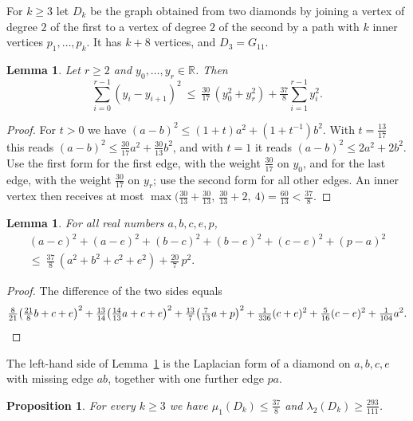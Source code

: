 \documentclass[11pt]{amsart}
\newtheorem{proposition}[theorem]{Proposition}
\newtheorem{lemma}[theorem]{Lemma}
\theoremstyle{definition}
\theoremstyle{remark}
\newcommand{\R}{\mathbb{R}}
\begin{document}
For $k\ge3$ let $D_k$ be the graph obtained from two diamonds by joining a vertex of degree $2$
of the first to a vertex of degree $2$ of the second by a path with $k$ inner vertices
$p_1,\dots,p_k$. It has $k+8$ vertices, and $D_3=G_{11}$.

\begin{lemma}\label{lem:path}
Let $r\ge2$ and $y_0,\dots,y_r\in\R$. Then
\[
\sum_{i=0}^{r-1}(y_i-y_{i+1})^2\ \le\ \tfrac{30}{17}\,(y_0^2+y_r^2)+\tfrac{37}{8}\sum_{i=1}^{r-1}y_i^2 .
\]
\end{lemma}

\begin{proof}
For $t>0$ we have $(a-b)^2\le(1+t)a^2+(1+t^{-1})b^2$. With $t=\frac{13}{17}$ this reads
$(a-b)^2\le\frac{30}{17}a^2+\frac{30}{13}b^2$, and with $t=1$ it reads $(a-b)^2\le2a^2+2b^2$. Use
the first form for the first edge, with the weight $\frac{30}{17}$ on $y_0$, and for the last
edge, with the weight $\frac{30}{17}$ on $y_r$; use the second form for all other edges. An
inner vertex then receives at most
$\max\bigl(\frac{30}{13}+\frac{30}{13},\ \frac{30}{13}+2,\ 4\bigr)=\frac{60}{13}<\frac{37}{8}$.
\end{proof}

\begin{lemma}\label{lem:diamond}
For all real numbers $a,b,c,e,p$,
\begin{multline*}
(a-c)^2+(a-e)^2+(b-c)^2+(b-e)^2+(c-e)^2+(p-a)^2\\
\le\ \tfrac{37}{8}\,(a^2+b^2+c^2+e^2)+\tfrac{20}{7}\,p^2 .
\end{multline*}
\end{lemma}

\begin{proof}
The difference of the two sides equals
\[
\tfrac{8}{21}\bigl(\tfrac{21}{8}b+c+e\bigr)^2+\tfrac{13}{14}\bigl(\tfrac{14}{13}a+c+e\bigr)^2
+\tfrac{13}{7}\bigl(\tfrac{7}{13}a+p\bigr)^2+\tfrac{1}{336}(c+e)^2+\tfrac{5}{16}(c-e)^2+\tfrac{1}{104}a^2 .
\qedhere
\]
\end{proof}

The left-hand side of Lemma~\ref{lem:diamond} is the Laplacian form of a diamond on $a,b,c,e$
with missing edge $ab$, together with one further edge $pa$.

\begin{proposition}\label{prop:family}
For every $k\ge3$ we have $\mu_1(D_k)\le\frac{37}{8}$ and $\lambda_2(D_k)\ge\frac{293}{111}$.
\end{proposition}
\end{document}
